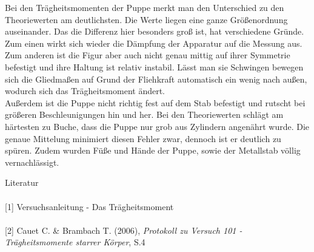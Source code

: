 Bei den Trägheitsmomenten der Puppe merkt man den Unterschied zu den Theoriewerten am deutlichsten. Die Werte liegen eine ganze Größenordnung auseinander. Das die Differenz hier besonders groß ist, hat verschiedene Gründe. Zum einen wirkt sich wieder die Dämpfung der Apparatur auf die Messung aus. Zum anderen ist die Figur aber auch nicht genau mittig auf ihrer Symmetrie befestigt und ihre Haltung ist relativ instabil. Lässt man sie Schwingen bewegen sich die Gliedmaßen auf Grund der Fliehkraft automatisch ein wenig nach außen, wodurch sich das Trägheitsmoment ändert.\\
Außerdem ist die Puppe nicht richtig fest auf dem Stab befestigt und rutscht bei größeren Beschleunigungen hin und her.
Bei den Theoriewerten schlägt am härtesten zu Buche, dass die Puppe nur grob aus Zylindern angenährt wurde. Die genaue Mittelung minimiert diesen Fehler zwar, dennoch ist er deutlich zu spüren. Zudem wurden Füße und Hände der Puppe, sowie der Metallstab völlig vernachlässigt.


\parskip 80pt
\Large{Literatur}\\\\
\large{[1] Versuchsanleitung - Das Trägheitsmoment}\\\\
\large{[2] Cauet C. \& Brambach T. (2006), \textit{Protokoll zu Versuch 101 - Trägheitsmomente starrer Körper}, S.4}\\\\





